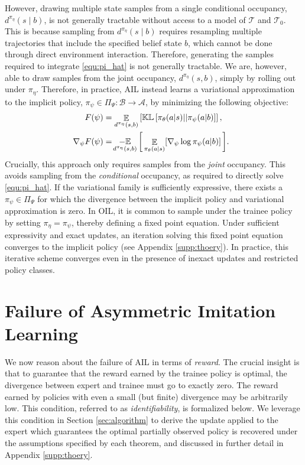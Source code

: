 However, drawing multiple state samples from a single conditional occupancy, $d^{\pi_{\eta}}(s \mid b)$, is not generally tractable without access to a model of $\mathcal{T}$ and $\mathcal{T}_0$. This is because sampling from $d^{\pi_{\eta}}(s \mid b)$ requires resampling multiple trajectories that include the specified belief state $b$, which cannot be done through direct environment interaction. Therefore, generating the samples required to integrate \eqref{equ:pi_hat} is not generally tractable.  We are, however, able to draw samples from the joint occupancy, $d^{\pi_{\eta}}(s,b)$, simply by rolling out under $\pi_{\eta}$.  Therefore, in practice, AIL instead learns a variational approximation to the implicit policy, $\pi_{\psi} \in \Pi_{\Psi}:\mathcal{B} \rightarrow \mathcal{A}$, by minimizing the following objective:
\begin{align}
    F(\psi) &= \mathop{\mathbb{E}}_{d^{\pi_{\eta}}(s,b)}  \left[ \mathbb{KL} \left[ \pi_{\theta}(a|s) || \pi_{\psi}(a|b) \right] \right], \label{equ:def:variational:obj} \\%
    \hspace{-0.2cm}\nabla_{\psi} F (\psi) &= \!  \mathop{\mathbb{-E}}_{d^{\pi_{\eta}}(s, b)} \bigg[ \mathop{\mathbb{E}}_{\pi_{\theta}(a | s)} \! \left[ \nabla_{\psi} \log \pi_{\psi} (a | b) \right] \bigg]. \label{equ:def:variational:gradient}
\end{align}
Crucially, this approach only requires samples from the \emph{joint} occupancy.  This avoids sampling from the \emph{conditional} occupancy, as required to directly solve \eqref{equ:pi_hat}.  If the variational family is sufficiently expressive, there exists a $\pi_{\psi}\in\Pi_{\Psi}$ for which the divergence between the implicit policy and variational approximation is zero.  In OIL, it is common to sample under the trainee policy by setting $\pi_{\eta} = \pi_{\psi}$, thereby defining a fixed point equation.  Under sufficient expressivity and exact updates, an iteration solving this fixed point equation converges to the implicit policy (see Appendix \ref{supp:thoery}).  In practice, this iterative scheme converges even in the presence of inexact updates and restricted policy classes. 






\section{Failure of Asymmetric Imitation Learning}
\label{sec:il-failure}
We now reason about the failure of AIL in terms of \emph{reward}.  The crucial insight is that to guarantee that the reward earned by the trainee policy is optimal, the divergence between expert and trainee must go to exactly zero.  The reward earned by policies with even a small (but finite) divergence may be arbitrarily low.  This condition, referred to as \emph{identifiability}, is formalized below.  We leverage this condition in Section \ref{sec:algorithm} to derive the update applied to the expert which guarantees the optimal partially observed policy is recovered under the assumptions specified by each theorem, and discussed in further detail in Appendix \ref{supp:thoery}.

